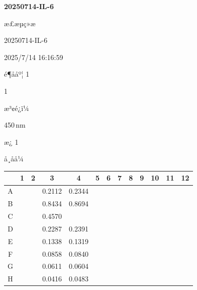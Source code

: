 \documentclass[UTF8,10pt,a4paper,fontset=fandol]{ctexart}
\newcommand{\fieldvalue}[1]{#1}
\begin{document}
\newpage

\noindent\textbf{20250714-IL-6}

\medskip
\noindent æ£æµç»æ

\fieldvalue{20250714-IL-6}

\fieldvalue{2025/7/14 16:16:59}

\noindent é¶ååº¦ 1

\fieldvalue{1}

\medskip
\noindent æ³¢é¿ï¼

\fieldvalue{450\,nm}

\noindent æ¿ 1

\noindent å¸åå¼

\begin{center}
\scriptsize
\begin{tabular}{c|*{12}{c}}
 & 1 & 2 & 3 & 4 & 5 & 6 & 7 & 8 & 9 & 10 & 11 & 12\\ \hline
A & & & 0.2112 & 0.2344 & \text{---} & \text{---} & \text{---} & \text{---} & \text{---} & \text{---} & \text{---} & \\ \hline
B & & & 0.8434 & 0.8694 & \text{---} & \text{---} & \text{---} & \text{---} & \text{---} & \text{---} & \text{---} & \\ \hline
C & & & 0.4570 & \text{---} & \text{---} & \text{---} & \text{---} & \text{---} & \text{---} & \text{---} & \text{---} & \\ \hline
D & & & 0.2287 & 0.2391 & \text{---} & \text{---} & \text{---} & \text{---} & \text{---} & \text{---} & \text{---} & \\ \hline
E & & & 0.1338 & 0.1319 & \text{---} & \text{---} & \text{---} & \text{---} & \text{---} & \text{---} & \text{---} & \\ \hline
F & & & 0.0858 & 0.0840 & \text{---} & \text{---} & \text{---} & \text{---} & \text{---} & \text{---} & \text{---} & \\ \hline
G & & & 0.0611 & 0.0604 & \text{---} & \text{---} & \text{---} & \text{---} & \text{---} & \text{---} & \text{---} & \\ \hline
H & & & 0.0416 & 0.0483 & \text{---} & \text{---} & \text{---} & \text{---} & \text{---} & \text{---} & \text{---} &
\end{tabular}
\end{center}
\end{document}
